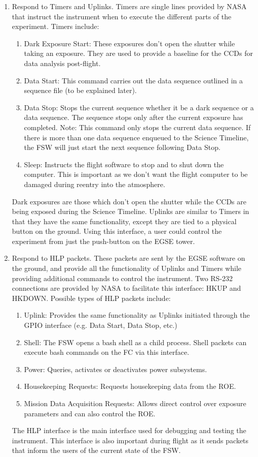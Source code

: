 \begin{enumerate}
  \item Respond to Timers and Uplinks. Timers are single lines provided by NASA that instruct the instrument when to execute the different parts of the experiment. Timers include: 
	\begin{enumerate}
		\item Dark Exposure Start: These exposures don't open the shutter while taking an exposure. They are used to provide a baseline for the CCDs for data analysis post-flight.
		\item Data Start: This command carries out the data sequence outlined in a sequence file (to be explained later).
		\item Data Stop: Stops the current sequence whether it be a dark sequence or a data sequence. The sequence stops only after the current exposure has completed. Note: This command only stops the current data sequence. If there is more than one data sequence enqueued to the Science Timeline, the FSW will just start the next sequence following Data Stop.
		\item Sleep: Instructs the flight software to stop and to shut down the computer. This is important as we don't want the flight computer to be damaged during reentry into the atmosphere.
	\end{enumerate}
 Dark exposures are those which don't open the shutter while the CCDs are being exposed during the Science Timeline. Uplinks are similar to Timers in that they have the same functionality, except they are tied to a physical button on the ground. Using this interface, a user could control the experiment from just the push-button on the EGSE tower. 

  \item Respond to HLP packets. These packets are sent by the EGSE software on the ground, and provide all the functionality of Uplinks and Timers while providing additional commands to control the instrument. Two RS-232 connections are provided by NASA to facilitate this interface: HKUP and HKDOWN. Possible types of HLP packets include:
	\begin{enumerate}
		\item Uplink: Provides the same functionality as Uplinks initiated through the GPIO interface (e.g. Data Start, Data Stop, etc.)
		\item Shell: The FSW opens a bash shell as a child process. Shell packets can execute bash commands on the FC via this interface.
		\item Power: Queries, activates or deactivates power subsystems.
		\item Housekeeping Requests: Requests housekeeping data from the ROE.
		\item Mission Data Acquisition Requests: Allows direct control over exposure parameters and can also control the ROE.
	\end{enumerate}
The HLP interface is the main interface used for debugging and testing the instrument. This interface is also important during flight as it sends packets that inform the users of the current state of the FSW.
	
\end{enumerate}

